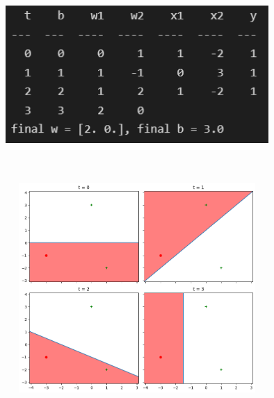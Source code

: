 \begin{solution}
  \\
  \graphicspath{{images/}}
  \includegraphics[width=10cm, height=8cm]{Problem_4_A_Table.png}\\
  \includegraphics[width=10cm, height=8cm]{Problem_4_A.png}\\
\end{solution}

